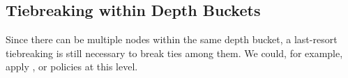 \subsection{Tiebreaking within Depth Buckets}

Since there can be multiple nodes within the same depth bucket,
a last-resort tiebreaking is still necessary to break ties among them.
We could, for example, apply \lifo, \fifo or \ro policies at this level.




